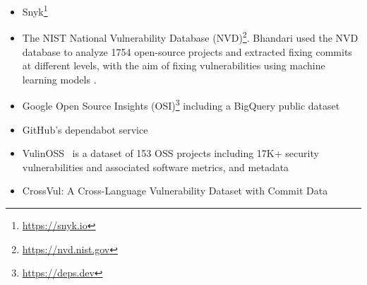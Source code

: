 \begin{itemize}
    \item Snyk\footnote{\url{https://snyk.io}}

    \item The NIST National Vulnerability Database (NVD)\footnote{\url{https://nvd.nist.gov}}. Bhandari \etal \cite{Bhandari2021PROMISE} used the NVD database to analyze 1754 open-source projects and extracted fixing commits at different levels, with the aim of fixing vulnerabilities using machine learning models .

    \item Google Open Source Insights (OSI)\footnote{\url{https://deps.dev}} including a BigQuery public dataset

    \item GitHub's dependabot service

    \item {VulinOSS}~\cite{Gkortzis2018MSR} is a dataset of 153 OSS projects including  17K+ security vulnerabilities and  associated software metrics, and metadata 

    \item {CrossVul}: A Cross-Language Vulnerability Dataset with Commit Data \cite{Nikitopoulos2021CrossVul}


\end{itemize}
